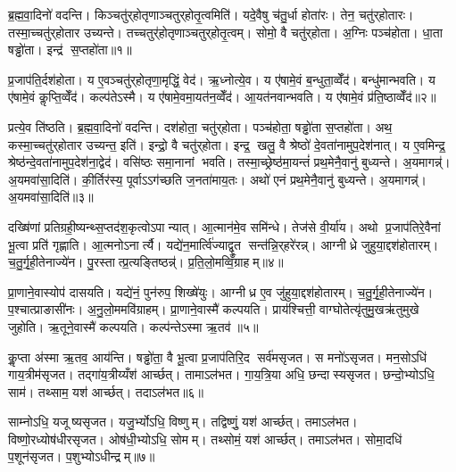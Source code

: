 
\clearpage
{}
\setcounter{anuvakam}{0}
ब्र॒ह्म॒वा॒दिनो॑ वदन्ति। किञ्चतु॑र्‌होतृणाञ्चतुर्‌होतृ॒त्वमिति॑। यदे॒वैषु च॑तु॒र्धा होता॑रः। तेन॒ चतु॑र्‌होतारः। तस्मा॒च्चतु॑र्‌होतार उच्यन्ते। तच्चतुर्॑होतृणाञ्चतुर्‌होतृ॒त्वम्। सोमो॒ वै चतु॑र्‌होता। अ॒ग्निः पञ्च॑होता। धा॒ता षड्ढो॑ता। इन्द्र॑ स॒प्तहो॑ता॥१॥

प्र॒जाप॑ति॒र्दश॑होता। य ए॒वञ्चतु॑र्‌होतृणा॒मृद्धिं॒ वेद॑। ऋ॒ध्नोत्ये॒व। य ए॑षामे॒वं ब॒न्धुता॒व्वेँद॑। बन्धु॑मान्भवति। य ए॑षामे॒वं कॢप्ति॒व्वेँद॑। कल्प॑तेऽस्मै। य ए॑षामे॒वमा॒यत॑न॒व्वेँद॑। आ॒यत॑नवान्भवति। य ए॑षामे॒वं प्र॑ति॒ष्ठाव्वेँद॑॥२॥

प्रत्ये॒व ति॑ष्ठति। ब्र॒ह्म॒वा॒दिनो॑ वदन्ति। दश॑होता॒ चतु॑र्‌होता। पञ्च॑होता॒ षड्ढो॑ता स॒प्तहो॑ता। अथ॒ कस्मा॒च्चतु॑र्‌होतार उच्यन्त॒ इति॑। इन्द्रो॒ वै चतु॑र्‌होता। इन्द्र॒ खलु॒ वै श्रेष्ठो॑ दे॒वता॑नामुप॒देश॑नात्। य ए॒वमिन्द्र॒ श्रेष्ठ॑न्दे॒वता॑नामुप॒देश॑ना॒द्वेद॑। वसि॑ष्ठः समा॒नानां भवति। तस्मा॒च्छ्रेष्ठ॑मा॒यन्तं॑ प्रथ॒मेनै॒वानु॑ बुध्यन्ते। अ॒यमागन्न्॑। अ॒यमवा॑सा॒दिति॑। की॒र्तिर॑स्य॒ पूर्वाऽऽग॑च्छति ज॒नता॑माय॒तः। अथो॑ एनं प्रथ॒मेनै॒वानु॑ बुध्यन्ते। अ॒यमागन्न्॑। अ॒यमवा॑सा॒दिति॑॥३॥\anuvakamend[स॒प्तहो॑ता प्रति॒ष्ठाव्वेँद॑ बुध्यन्ते॒ षट्च॑]

दख्षि॑णां प्रतिग्रही॒ष्यन्थ्स॒प्तद॑श॒कृत्वोऽपान्यात्। आ॒त्मान॑मे॒व समि॑न्धे। तेज॑से वी॒र्या॑य। अथो प्र॒जाप॑तिरे॒वैनां भू॒त्वा प्रति॑ गृह्णाति। आ॒त्मनोऽनार्त्यै। यद्ये॑न॒मार्त्वि॑ज्याद्वृ॒त सन्त॑न्नि॒र्‌हरे॑रन्न्। आग्नीध्रे जुहुया॒द्दश॑होतारम्। च॒तु॒र्गृ॒ही॒तेनाज्ये॑न। पु॒रस्तात्प्र॒त्यङ्तिष्ठन्न्॑। प्र॒ति॒लो॒मव्विँ॒ग्राहम्॥४॥

प्रा॒णाने॒वास्योप॑ दासयति। यद्ये॑नं॒ पुन॑रुप॒ शिख्षे॑युः। आग्नीध्र ए॒व जु॑हुया॒द्दश॑होतारम्। च॒तु॒र्गृ॒ही॒तेनाज्ये॑न। प॒श्चात्प्राङासी॑नः। अ॒नु॒लो॒ममवि॑ग्राहम्। प्रा॒णाने॒वास्मै॑ कल्पयति। प्राय॑श्चित्ती॒ वाग्घोतेत्यृ॑तुमु॒खऋ॑तुमुखे जुहोति। ऋ॒तूने॒वास्मै॑ कल्पयति। कल्प॑न्तेऽस्मा ऋ॒तव॑॥५॥

कॢ॒प्ता अ॑स्मा ऋ॒तव॒ आय॑न्ति। षड्ढो॑ता॒ वै भू॒त्वा प्र॒जाप॑तिरि॒द सर्व॑मसृजत। स मनो॑ऽसृजत। मन॒सोऽधि॑ गाय॒त्रीम॑सृजत। तद्गा॑य॒त्रीय्यँश॑ आर्च्छत्। तामाऽल॑भत। गा॒य॒त्रि॒या अधि॒ छन्दास्यसृजत। छन्दो॒भ्योऽधि॒ साम॑। तथ्साम॒ यश॑ आर्च्छत्। तदाऽल॑भत॥६॥

साम्नोऽधि॒ यजूष्यसृजत। यजु॒र्भ्योऽधि॒ विष्णुम्। तद्विष्णुं॒ यश॑ आर्च्छत्। तमाऽल॑भत। विष्णो॒रध्योष॑धीरसृजत। ओष॑धी॒भ्योऽधि॒ सोमम्। तथ्सोमं॒ यश॑ आर्च्छत्। तमाऽल॑भत। सोमा॒दधि॑ प॒शून॑सृजत। प॒शुभ्योऽधीन्द्रम्॥७॥

